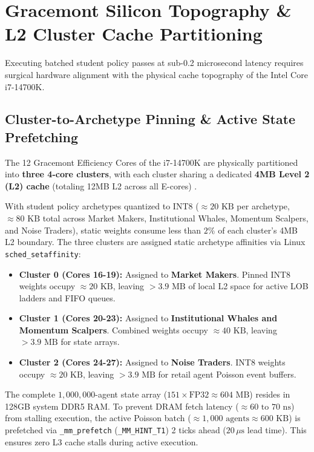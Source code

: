 \section{Gracemont Silicon Topography \& L2 Cluster Cache Partitioning}

Executing batched student policy passes at sub-0.2 microsecond latency requires surgical hardware alignment with the physical cache topography of the Intel Core i7-14700K.

\subsection{Cluster-to-Archetype Pinning \& Active State Prefetching}

The 12 Gracemont Efficiency Cores of the i7-14700K are physically partitioned into \textbf{three 4-core clusters}, with each cluster sharing a dedicated \textbf{4MB Level 2 (L2) cache} (totaling 12MB L2 across all E-cores) \cite{intel2024optimization}.

With student policy archetypes quantized to INT8 ($\approx 20\text{ KB}$ per archetype, $\approx 80\text{ KB}$ total across Market Makers, Institutional Whales, Momentum Scalpers, and Noise Traders), static weights consume less than $2\%$ of each cluster's 4MB L2 boundary. The three clusters are assigned static archetype affinities via Linux \texttt{sched\_setaffinity}:

\begin{itemize}
    \item \textbf{Cluster 0 (Cores 16-19):} Assigned to \textbf{Market Makers}. Pinned INT8 weights occupy $\approx 20\text{ KB}$, leaving $>3.9\text{ MB}$ of local L2 space for active LOB ladders and FIFO queues.
    \item \textbf{Cluster 1 (Cores 20-23):} Assigned to \textbf{Institutional Whales and Momentum Scalpers}. Combined weights occupy $\approx 40\text{ KB}$, leaving $>3.9\text{ MB}$ for state arrays.
    \item \textbf{Cluster 2 (Cores 24-27):} Assigned to \textbf{Noise Traders}. INT8 weights occupy $\approx 20\text{ KB}$, leaving $>3.9\text{ MB}$ for retail agent Poisson event buffers.
\end{itemize}

The complete $1,000,000$-agent state array ($151 \times \text{FP32} \approx 604\text{ MB}$) resides in 128GB system DDR5 RAM. To prevent DRAM fetch latency ($\approx 60\text{ to }70\text{ ns}$) from stalling execution, the active Poisson batch ($\approx 1,000\text{ agents} \approx 600\text{ KB}$) is prefetched via \texttt{\_mm\_prefetch} (\texttt{\_MM\_HINT\_T1}) 2 ticks ahead ($20\,\mu\text{s}$ lead time). This ensures zero L3 cache stalls during active execution.

